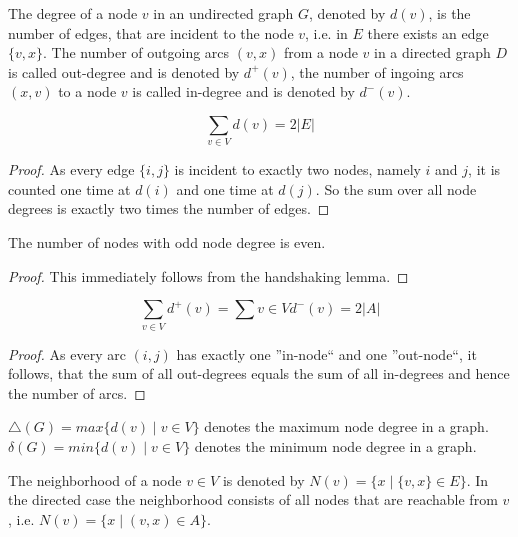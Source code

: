 \begin{definition}
The degree of a node $v$ in an undirected graph $G$, denoted by $d(v)$, is the number of edges, that are incident to the node $v$, i.e. in $E$ there exists an edge $\{v, x\}$. The number of outgoing arcs $(v, x)$ from a node $v$ in a directed graph $D$ is called out-degree and is denoted by $d^+(v)$, the number of ingoing arcs $(x, v)$ to a node $v$ is called in-degree and is denoted by $d^-(v)$.
\end{definition}

\begin{lemma}
$$\sum_{v \in V}d(v) = 2\left\vert{E}\right\vert$$
\end{lemma}
\begin{proof}
As every edge $\{i, j\}$ is incident to exactly two nodes, namely $i$ and $j$, it is
counted one time at $d(i)$ and one time at $d(j)$. So the sum over all node degrees
is exactly two times the number of edges.
\end{proof}

\begin{corollary}
The number of nodes with odd node degree is even.
\end{corollary}
\begin{proof}
This immediately follows from the handshaking lemma.
\end{proof}

\begin{lemma}
$$\sum_{v\in V}d^+(v)=\sum{v\in V}d^-(v)=2\left\vert{A}\right\vert$$
\end{lemma}
\begin{proof}
As every arc $(i, j)$ has exactly one ”in-node“ and one ”out-node“, it follows,
that the sum of all out-degrees equals the sum of all in-degrees and hence the
number of arcs.
\end{proof}


\begin{definition}
$\triangle (G) = max\{d(v) \mid v \in V \}$ denotes the maximum node degree in a graph. $\delta (G) = min\{d(v) \mid v \in V \}$ denotes the minimum node degree in a graph.
\end{definition}

\begin{definition}
The neighborhood of a node $v \in V$ is denoted by $N(v) = \{x \mid \{v, x\} \in E\}$. In the directed case the neighborhood consists of all nodes that are reachable from $v$, i.e. $N(v) = \{x \mid (v, x) \in A\}$.
\end{definition}

